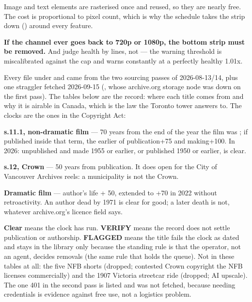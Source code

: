\documentclass[fontpath=fonts/,logopath=logo/]{riposte-doc}
\begin{document}
Image and text elements are rasterised once and reused, so they are nearly free. The cost is proportional to pixel count, which is why the schedule takes the strip down () around every feature.

\textbf{If the channel ever goes back to 720p or 1080p, the bottom strip must be removed.} And judge health by \ripmono{[FTL]} lines, not \ripmono{[WRN]} — the warning threshold is miscalibrated against the  cap and warns constantly at a perfectly healthy 1.01x.



Every file under  and  came from the two sourcing passes of 2026-08-13/14, plus one straggler fetched 2026-09-15 (, whose archive.org storage node was down on the first pass). The tables below are the record: where each title comes from and why it is airable in Canada, which is the law the Toronto tower answers to. The clocks are the ones in the Copyright Act:

\begin{ripbullets}
\item \textbf{s.11.1, non-dramatic film} — 70 years from the end of the year the film was ; if published inside that term, the earlier of publication+75 and making+100. In 2026: unpublished and made 1955 or earlier, or published 1950 or earlier, is clear.
\item \textbf{s.12, Crown} — 50 years from publication. It does  open for the City of Vancouver Archives reels: a municipality is not the Crown.
\item \textbf{Dramatic film} — author's life + 50, extended to +70 in 2022 without retroactivity. An author dead by 1971 is clear for good; a later death is not, whatever archive.org's licence field says.
\end{ripbullets}

\textbf{Clear} means the clock has run. \textbf{VERIFY} means the record does not settle publication or authorship. \textbf{FLAGGED} means the title fails the clock as dated and stays in the library only because the standing rule is that the operator, not an agent, decides removals (the same rule that holds the  queue). Not in these tables at all: the five NFB shorts (dropped; contested Crown copyright the NFB licenses commercially) and the 1907 Victoria streetcar ride (dropped; AI upscale). The one 401 in the second pass is listed and was not fetched, because needing credentials is evidence against free use, not a logistics problem.
\end{document}

